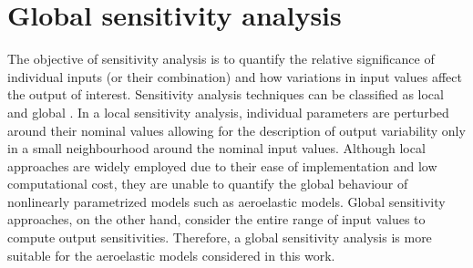 %



\section{Global sensitivity analysis}\label{sec:GSA}
The objective of sensitivity analysis is to quantify the relative significance of individual inputs (or their combination) and how variations in input values affect the output of interest. Sensitivity analysis techniques can be classified as local and global \cite{RSmith}. In a local sensitivity analysis, individual parameters are perturbed around their nominal values allowing for the description of output variability only in a small neighbourhood around the nominal input values. Although local approaches are widely employed due to their ease of implementation and low computational cost, they are unable to quantify the global behaviour of nonlinearly parametrized models such as aeroelastic models. Global sensitivity approaches, on the other hand, consider the entire range of input values to compute output sensitivities. Therefore, a global sensitivity analysis is more suitable for the aeroelastic models considered in this work.  

